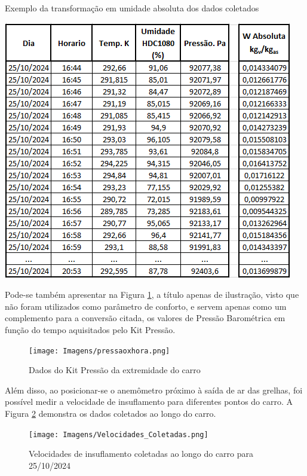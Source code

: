 \documentclass[acronym,symbols,table]{fei}
\begin{document}
\begin{table}[!htb] 
 \centering
    \caption{Exemplo da transformação em umidade absoluta dos dados coletados}
    \includegraphics[width=0.6\linewidth]{Tabelas/Exemplo_Dados_Kit.png}
    \label{tab:Exemplo_Dados_Kit}
\end{table}

\newpage

Pode-se também apresentar na Figura \ref{fig:presstempo}, a título apenas de ilustração, visto que não foram utilizados como parâmetro de conforto, e servem apenas como um complemento para a conversão citada, os valores de Pressão Barométrica em função do tempo aquisitados pelo Kit Pressão.

\begin{figure}[!htb]
    \centering
    \caption{Dados do Kit Pressão da extremidade do carro}
    \texttt{[image: Imagens/pressaoxhora.png]}
    \label{fig:presstempo}
\end{figure}

Além disso, ao posicionar-se o anemômetro próximo à saída de ar das grelhas, foi possível medir a velocidade de insuflamento para diferentes pontos do carro. A Figura \ref{fig:Velocidades_Coletadas} demonstra os dados coletados ao longo do carro.

\begin{figure}[!htb]
    \centering
    \caption{Velocidades de insuflamento coletadas ao longo do carro para 25/10/2024}
    \texttt{[image: Imagens/Velocidades\_Coletadas.png]}
    \label{fig:Velocidades_Coletadas}
\end{figure}
\end{document}
